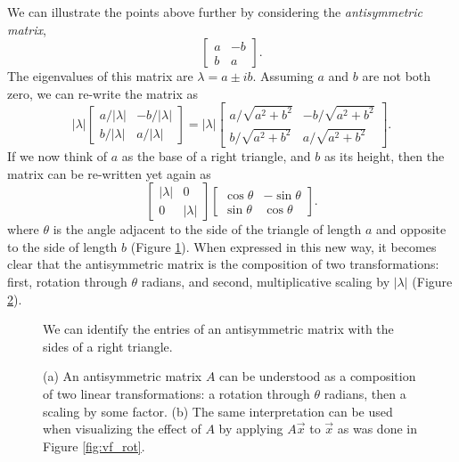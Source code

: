 \documentclass[../book.tex]{subfiles}
\begin{document}
We can illustrate the points above further by considering the \emph{antisymmetric matrix},
\begin{equation}\label{eq:eig-25}
\begin{bmatrix}
  a & -b\\
  b & a
\end{bmatrix}.
\end{equation}
The eigenvalues of this matrix are \(\lambda = a\pm i b\). Assuming \(a\) and \(b\) are not both zero, we can re-write the matrix as
\begin{equation}\label{eq:eig-26}
|\lambda |
\begin{bmatrix}
  a/|\lambda| & -b/|\lambda|\\
  b/|\lambda| & a/|\lambda|
\end{bmatrix}
=
|\lambda |
\begin{bmatrix}
  a/\sqrt{a^2+b^2} & -b/\sqrt{a^2+b^2}\\
  b/\sqrt{a^2+b^2} & a/\sqrt{a^2+b^2}
\end{bmatrix}.
\end{equation}
If we now think of \(a\) as the base of a right triangle, and \(b\) as its height, then the matrix can be re-written yet again as
\begin{equation}\label{eq:eig-27}
\begin{bmatrix}
  |\lambda | & 0 \\
  0 & |\lambda|
\end{bmatrix}
\begin{bmatrix}
  \cos \theta & -\sin \theta\\
  \sin \theta & \cos \theta
\end{bmatrix}.
\end{equation}
where \(\theta\) is the angle adjacent to the side of the triangle of length \(a\) and opposite to the side of length \(b\) (Figure \ref{fig:triangle}). When expressed in this new way, it becomes clear that the antisymmetric matrix is the composition of two transformations: first, rotation through \(\theta\) radians, and second, multiplicative scaling by \(|\lambda|\) (Figure \ref{fig:comp_two}).

\begin{figure}[htbp]
  \centering
  \caption{We can identify the entries of an antisymmetric matrix with the sides of a right triangle.}
  \label{fig:triangle}
\end{figure}

\begin{figure}[htbp]
  \centering
  \caption{(a) An antisymmetric matrix \(A\) can be understood as a composition of two linear transformations: a rotation through \(\theta\) radians, then a scaling by some factor. (b) The same interpretation can be used when visualizing the effect of \(A\) by applying \(A \vec{x}\) to \(\vec{x}\) as was done in Figure \ref{fig:vf_rot}.}
  \label{fig:comp_two}
\end{figure}
\end{document}
